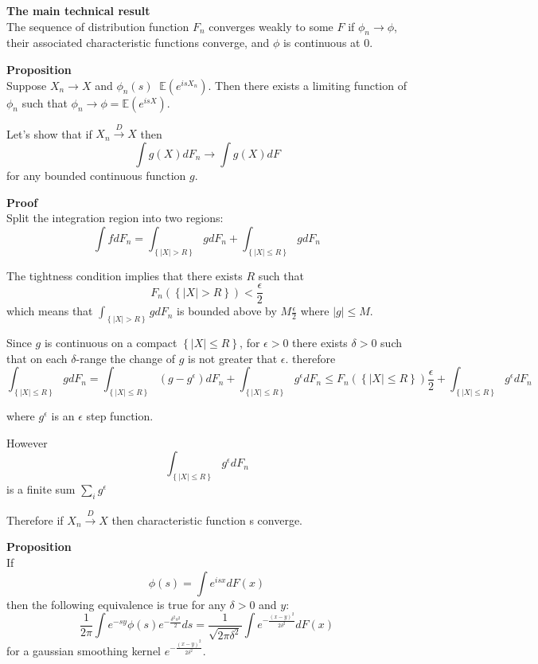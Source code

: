 \documentclass[a4paper]{article}
\newcommand{\obj}[1]{{\left\{ #1 \right \}}}
\newcommand{\brac}[1]{{\left ( #1 \right )}}
\newcommand{\abs}[1]{{\left | #1 \right |}}
\newcommand{\Ex}{\mathbb{E}}
\newcommand{\defn}{\mathop{\overset{\Delta}{=}}\nolimits}
\begin{document}


\noindent \textbf{The main technical result}\hfill\\

The sequence of distribution function $F_n$ converges weakly to some $F$ if $\phi_n\to \phi$, their associated characteristic functions converge, and $\phi$ is continuous at $0$.

\noindent \textbf{Proposition}\hfill\\

Suppose $X_n\to X$ and $\phi_n(s)\defn \Ex\brac{e^{isX_n}}$. Then there exists a limiting function of $\phi_n$ such that $\phi_n\to \phi = \Ex\brac{e^{isX}}$.

Let's show that if $X_n\overset{D}{\to} X$ then
\[\int g(X) dF_n \to \int g(X)dF\]
for any bounded continuous function $g$.

\textbf{Proof}\hfill\\
Split the integration region into two regions:
\[\int f dF_n = \int_\obj{\abs{X}>R} g dF_n + \int_\obj{\abs{X}\leq R} g dF_n\]

The tightness condition implies that there exists $R$ such that
\[F_n\brac{\obj{\abs{X}>R}}< \frac{\epsilon}{2}\]
which means that $\int_\obj{\abs{X}>R} g dF_n$ is bounded above by $M\frac{\epsilon}{2}$ where $\abs{g}\leq M$.

Since $g$ is continuous on a compact $\obj{\abs{X}\leq R}$, for $\epsilon>0$ there exists $\delta>0$ such that on each $\delta$-range the change of $g$ is not greater that $\epsilon$.
therefore 
\[\int_\obj{\abs{X}\leq R} g dF_n = \int_\obj{\abs{X}\leq R} (g-g^\epsilon) dF_n + \int_\obj{\abs{X}\leq R} g^\epsilon dF_n \leq F_n\brac{\obj{\abs{X}\leq R}}\frac{\epsilon}{2} + \int_\obj{\abs{X}\leq R} g^\epsilon dF_n\]

where $g^\epsilon$ is an $\epsilon$ step function.

However
\[\int_\obj{\abs{X}\leq R} g^\epsilon dF_n\]
is a finite sum $\sum_i g^\epsilon$

Therefore if $X_n\overset{D}{\to} X$ then characteristic function s converge.



\noindent\textbf{Proposition} \hfill\\
If
\[\phi(s) = \int e^{isx} dF(x)\]
then the following equivalence is true for any $\delta>0$ and $y$:
\[\frac{1}{2\pi}\int e^{-sy} \phi(s) e^{-\frac{\delta^2 s^2}{2}}ds
=\frac{1}{\sqrt{2\pi\delta^2}}\int e^{-\frac{{(x-y)}^2}{2\delta^2}}dF(x)\]
for a gaussian smoothing kernel $e^{-\frac{{(x-y)}^2}{2\delta^2}}$.
\end{document}
